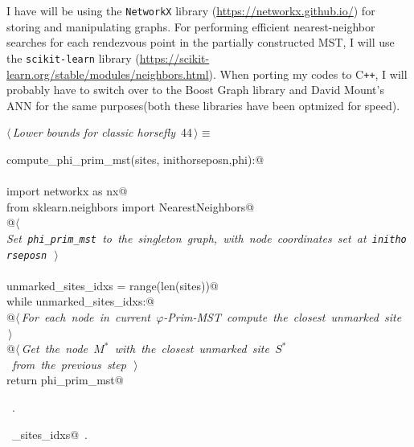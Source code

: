 \documentclass[11.5pt]{report}
\begin{document}
I have will be using the \verb|NetworkX| library (\url{https://networkx.github.io/}) for 
storing and manipulating graphs. For performing efficient nearest-neighbor searches for 
each rendezvous point in the partially constructed MST, I will use the \verb|scikit-learn| 
library (\url{https://scikit-learn.org/stable/modules/neighbors.html}). When porting 
my codes to C\texttt{++}, I will probably have to switch over to the Boost Graph library and 
David Mount's ANN for the same purposes(both these libraries have been optmized for speed). 
\begin{flushleft} \small
\begin{minipage}{\linewidth}\label{scrap61}\raggedright\small
{} $\langle\,${\itshape Lower bounds for classic horsefly}\nobreak\ {\footnotesize {44}}$\,\rangle\equiv$
\vspace{-1ex}
\begin{list}{}{} \item
\mbox{}\verb@def compute_phi_prim_mst(sites, inithorseposn,phi):@\\
\mbox{}\verb@@\\
\mbox{}\verb@     import networkx as nx@\\
\mbox{}\verb@     from sklearn.neighbors import NearestNeighbors@\\
\mbox{}\verb@     @\hbox{$\langle\,${\itshape Set \verb|phi_prim_mst| to the singleton graph, with node coordinates set at \verb|inithorseposn|}\nobreak\ {\footnotesize {}}$\,\rangle$}\verb@@\\
\mbox{}\verb@@\\
\mbox{}\verb@     unmarked_sites_idxs = range(len(sites))@\\
\mbox{}\verb@     while unmarked_sites_idxs:@\\
\mbox{}\verb@          @\hbox{$\langle\,${\itshape For each node in current $\varphi$-Prim-MST compute the closest unmarked site}\nobreak\ {\footnotesize {}}$\,\rangle$}\verb@@\\
\mbox{}\verb@          @\hbox{$\langle\,${\itshape Get the node $M^{*}$ with the closest unmarked site $S^{*}$ from the previous step}\nobreak\ {\footnotesize {}}$\,\rangle$}\verb@@\\
\mbox{}\verb@     return phi_prim_mst@\\
\mbox{}\verb@@{\NWsep}
\end{list}
\vspace{-1.5ex}
\footnotesize
\begin{list}{}{\setlength{\itemsep}{-\parsep}\setlength{\itemindent}{-\leftmargin}}
\item \NWtxtMacroRefIn\ .
\item \NWtxtIdentsDefed\nobreak\  \verb@unmarked_sites_idxs@\nobreak\ .
\item{}
\end{list}
\end{minipage}\vspace{4ex}
\end{flushleft}
\end{document}
